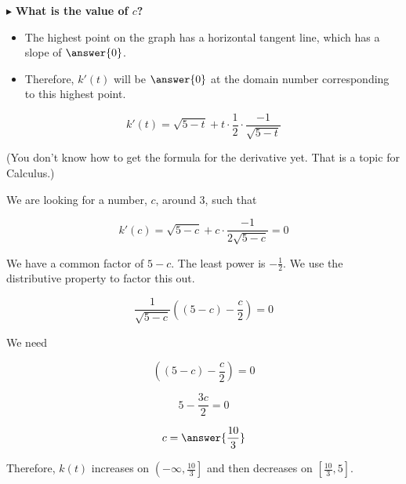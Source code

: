 \documentclass{ximera}
\begin{document}
$\blacktriangleright$ \textbf{\textcolor{blue!55!black}{What is the value of $c$?}} \\

\begin{explanation}


\begin{itemize}
\item The highest point on the graph has a horizontal tangent line, which has a slope of $\answer{0}$.  
\item Therefore, $k'(t)$ will be $\answer{0}$ at the domain number corresponding to this highest point.
\end{itemize}




\[   k'(t) = \sqrt{5-t} + t \cdot \frac{1}{2} \cdot \frac{-1}{\sqrt{5-t}}    \]

(You don't know how to get the formula for the derivative yet.  That is a topic for Calculus.)

We are looking for a number, $c$, around $3$, such that 


\[   k'(c) = \sqrt{5-c} + c \cdot \frac{-1}{2 \sqrt{5-c}}  = 0  \]

We have a common factor of $5-c$.  The least power is $-\frac{1}{2}$.  We use the distributive property to factor this out.


\[  \frac{1}{\sqrt{5-c}} \left( (5-c) - \frac{c}{2} \right) = 0  \]




We need 


\[  \left( (5-c) - \frac{c}{2} \right) = 0  \]

\[  5 - \frac{3c}{2}  = 0  \]


\[  c = \answer{\frac{10}{3}}  \]


\end{explanation}


Therefore, $k(t)$ increases on $\left(-\infty, \frac{10}{3}\right]$ and then decreases on $\left[\frac{10}{3},5\right]$.
\end{document}
